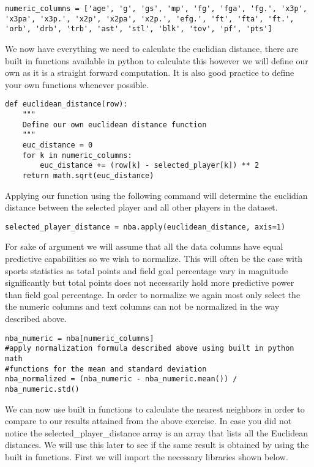 \begin{lstlisting}
numeric_columns = ['age', 'g', 'gs', 'mp', 'fg', 'fga', 'fg.', 'x3p',
'x3pa', 'x3p.', 'x2p', 'x2pa', 'x2p.', 'efg.', 'ft', 'fta', 'ft.',
'orb', 'drb', 'trb', 'ast', 'stl', 'blk', 'tov', 'pf', 'pts']
\end{lstlisting} 

We now have everything we need to calculate the euclidian distance,
there are built in functions available in python to calculate this
however we will define our own as it is a straight forward
computation. It is also good practice to define your own functions
whenever possible. 

\begin{lstlisting}
def euclidean_distance(row):
    """
    Define our own euclidean distance function
    """
    euc_distance = 0
    for k in numeric_columns:
        euc_distance += (row[k] - selected_player[k]) ** 2
    return math.sqrt(euc_distance)
\end{lstlisting} 

Applying our function using the following command will determine the
euclidian distance between the selected player and all other players
in the dataset. 

\begin{lstlisting}
selected_player_distance = nba.apply(euclidean_distance, axis=1)
\end{lstlisting} 

For sake of argument we will assume that all the data columns have
equal predictive capabilities so we wish to normalize. This will often
be the case with sports statistics as total points and field goal
percentage vary in magnitude significantly but total points does not
necessarily hold more predictive power than field goal percentage. In
order to normalize we again most only select the the numeric columns
and text columns can not be normalized in the way described above. 


\begin{lstlisting}
nba_numeric = nba[numeric_columns]
#apply normalization formula described above using built in python math
#functions for the mean and standard deviation
nba_normalized = (nba_numeric - nba_numeric.mean()) / nba_numeric.std()
\end{lstlisting} 

We can now use built in functions to calculate the nearest
neighbors in order to compare to our results attained from the above
exercise. In case you did not notice the selected\_player\_distance
array is an array that lists all the Euclidean distances. We will use
this later to see if the same result is obtained by using the built in
functions. First we will import the necessary libraries shown below. 

